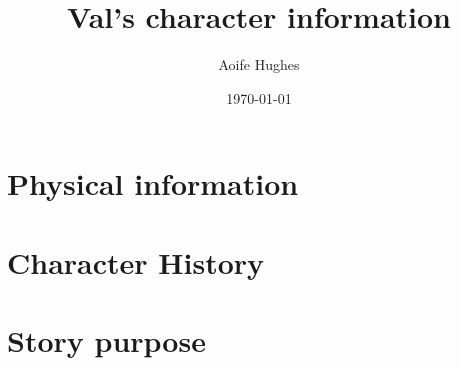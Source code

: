 \documentclass[11pt]{article}
\title{Val's character information}
\author{Aoife Hughes}
\date{\today}
\begin{document}
\maketitle	
\pagebreak


\section{Physical information}

\section{Character History}

\section{Story purpose}
\end{document}
